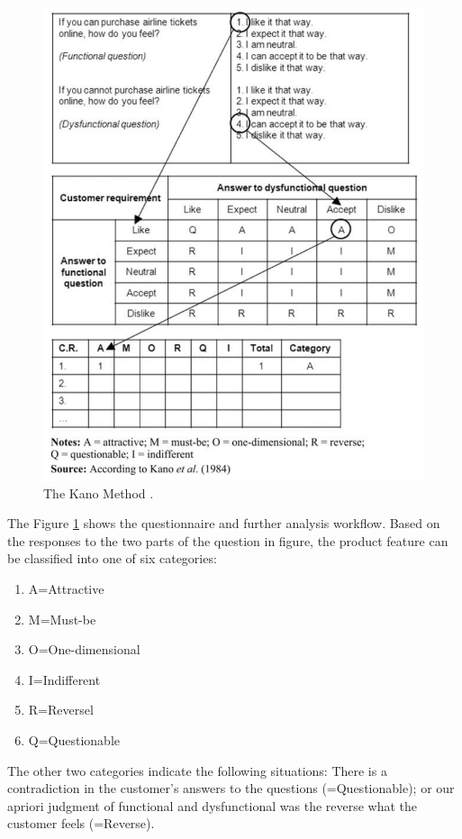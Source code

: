 \documentclass[../main.tex]{subfiles}
\begin{document}
\begin{figure}[h]
        \centering
        \includegraphics[scale=0.8]{img/2-background/kano/kanomodel.png}
        \caption{The Kano Method \cite{kanomodel1996}.}
        \label{fig:kanomodel}
\end{figure}

The Figure \ref{fig:kanomodel} shows the questionnaire and further analysis workflow. Based on the responses to the two parts of the question in figure, the product feature can be classified into one of six categories: 
\begin{enumerate}
    \item[] A=Attractive 
    \item[] M=Must-be 
    \item[] O=One-dimensional 
    \item[] I=Indifferent 
    \item[] R=Reversel 
    \item[] Q=Questionable 
\end{enumerate}

The other two categories indicate the following situations: There is a contradiction in the customer’s answers to the questions (=Questionable); or our apriori judgment of functional and dysfunctional was the reverse what the customer feels (=Reverse). \cite{berger1993kano}
\end{document}

